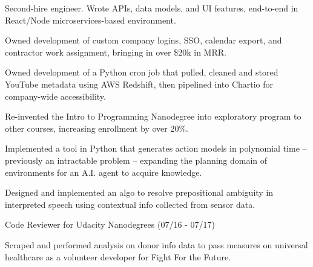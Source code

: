 \documentclass[]{deedy-resume-openfont}
\begin{document}
\begin{minipage}[t]{0.66\textwidth}
\begin{tightemize}
\item Second-hire engineer. Wrote APIs, data models, and UI features, end-to-end in React/Node microservices-based environment.
\item Owned development of custom company logins, SSO, calendar export, and contractor work assignment, bringing in over \$20k in MRR.

\end{tightemize}
\sectionsep

\begin{tightemize}

\item Owned development of a Python cron job that pulled, cleaned and stored YouTube metadata using AWS Redshift, then pipelined into Chartio for company-wide accessibility.
\item Re-invented the Intro to Programming Nanodegree into exploratory program to other courses, increasing enrollment by over 20\%.

\end{tightemize}
\sectionsep

\begin{tightemize}
\item Implemented a tool in Python that generates action models in polynomial time -- previously an intractable problem -- expanding the planning domain of environments for an A.I. agent to acquire knowledge.
\item Designed and implemented an algo to resolve prepositional ambiguity in interpreted speech using contextual info collected from sensor data.
\end{tightemize}
\sectionsep

\begin{tightemize}
\item Code Reviewer for Udacity Nanodegrees (07/16 - 07/17)
\item Scraped and performed analysis on donor info data to pass measures on universal healthcare as a volunteer developer for Fight For the Future.
\end{tightemize}



\end{minipage}
\end{document}
